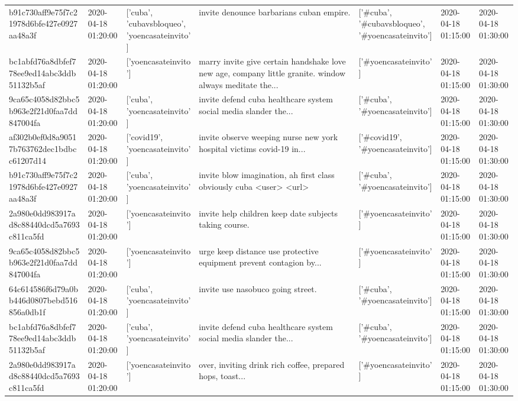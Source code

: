 \begin{tabular}{lllllll}
b91c730aff9e75f7c21978d6bfe427e0927aa48a3f & 2020-04-18 01:20:00 & ['cuba', 'cubavsbloqueo', 'yoencasateinvito'] & invite denounce barbarians cuban empire. & ['#cuba', '#cubavsbloqueo', '#yoencasateinvito'] & 2020-04-18 01:15:00 & 2020-04-18 01:30:00 \\
bc1abfd76a8dbfef778ee9ed14abc3ddb51132b5af & 2020-04-18 01:20:00 & ['yoencasateinvito'] & marry invite give certain handshake love new age, company little granite. window always meditate the... & ['#yoencasateinvito'] & 2020-04-18 01:15:00 & 2020-04-18 01:30:00 \\
9ca65c4058d82bbc5b963e2f21d0faa7dd847004fa & 2020-04-18 01:20:00 & ['cuba', 'yoencasateinvito'] & invite defend cuba healthcare system social media slander the... & ['#cuba', '#yoencasateinvito'] & 2020-04-18 01:15:00 & 2020-04-18 01:30:00 \\
af302b0ef0d8a90517b763762dec1bdbcc61207d14 & 2020-04-18 01:20:00 & ['covid19', 'yoencasateinvito'] & invite observe weeping nurse new york hospital victims covid-19 in... & ['#covid19', '#yoencasateinvito'] & 2020-04-18 01:15:00 & 2020-04-18 01:30:00 \\
b91c730aff9e75f7c21978d6bfe427e0927aa48a3f & 2020-04-18 01:20:00 & ['cuba', 'yoencasateinvito'] & invite blow imagination, ah first class obviously cuba <user> <url> & ['#cuba', '#yoencasateinvito'] & 2020-04-18 01:15:00 & 2020-04-18 01:30:00 \\
2a980e0dd983917ad8c88440dcd5a7693c811ca5fd & 2020-04-18 01:20:00 & ['yoencasateinvito'] & invite help children keep date subjects taking course. & ['#yoencasateinvito'] & 2020-04-18 01:15:00 & 2020-04-18 01:30:00 \\
9ca65c4058d82bbc5b963e2f21d0faa7dd847004fa & 2020-04-18 01:20:00 & ['yoencasateinvito'] & urge keep distance use protective equipment prevent contagion by... & ['#yoencasateinvito'] & 2020-04-18 01:15:00 & 2020-04-18 01:30:00 \\
64c614586f6d79a0bb446d0807bebd516856a0db1f & 2020-04-18 01:20:00 & ['cuba', 'yoencasateinvito'] & invite use nasobuco going street. & ['#cuba', '#yoencasateinvito'] & 2020-04-18 01:15:00 & 2020-04-18 01:30:00 \\
bc1abfd76a8dbfef778ee9ed14abc3ddb51132b5af & 2020-04-18 01:20:00 & ['cuba', 'yoencasateinvito'] & invite defend cuba healthcare system social media slander the... & ['#cuba', '#yoencasateinvito'] & 2020-04-18 01:15:00 & 2020-04-18 01:30:00 \\
2a980e0dd983917ad8c88440dcd5a7693c811ca5fd & 2020-04-18 01:20:00 & ['yoencasateinvito'] & over, inviting drink rich coffee, prepared hops, toast... & ['#yoencasateinvito'] & 2020-04-18 01:15:00 & 2020-04-18 01:30:00 \\

\end{tabular}
